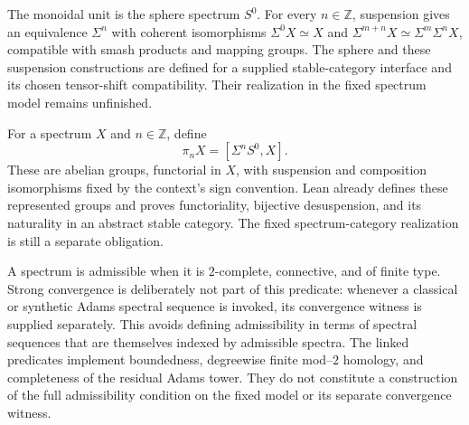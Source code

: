 \begin{definition}
  \label{def:stable-sphere-suspension}
  \notready
  The monoidal unit is the sphere spectrum $S^0$.  For every $n\in\mathbb Z$,
  suspension gives an equivalence $\Sigma^n$ with coherent isomorphisms
  $\Sigma^0X\simeq X$ and $\Sigma^{m+n}X\simeq\Sigma^m\Sigma^nX$, compatible
  with smash products and mapping groups.
  The sphere and these suspension constructions are defined for a supplied
  stable-category interface and its chosen tensor-shift compatibility.
  Their realization in the fixed spectrum model remains unfinished.
\end{definition}

\begin{definition}
  \label{def:stable-homotopy-group}
  \notready
  For a spectrum $X$ and $n\in\mathbb Z$, define
  \[
    \pi_nX=[\Sigma^nS^0,X].
  \]
  These are abelian groups, functorial in $X$, with suspension and composition
  isomorphisms fixed by the context's sign convention.
  Lean already defines these represented groups and proves functoriality,
  bijective desuspension, and its naturality in an abstract stable category.
  The fixed spectrum-category realization is still a separate obligation.
\end{definition}

\begin{definition}
  \label{def:admissible-spectrum}
  \notready
  A spectrum is admissible when it is $2$-complete, connective, and of finite
  type.  Strong convergence is deliberately not part of this predicate:
  whenever a classical or synthetic Adams spectral sequence is invoked, its
  convergence witness is supplied separately.  This avoids defining
  admissibility in terms of spectral sequences that are themselves indexed by
  admissible spectra.
  The linked predicates implement boundedness, degreewise finite mod--$2$
  homology, and completeness of the residual Adams tower. They do not
  constitute a construction of the full admissibility condition on the
  fixed model or its separate convergence witness.
\end{definition}

